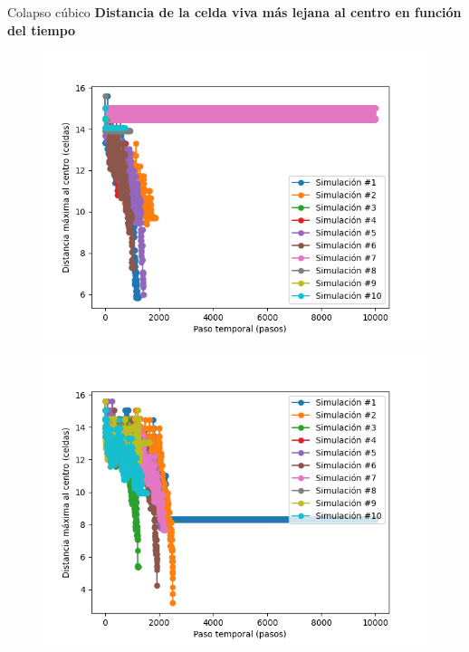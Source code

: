 \begin{frame}{Colapso cúbico}
    \textbf{Distancia de la celda viva más lejana al centro en función del tiempo}
    {\small
    \begin{multicols}{3}
        {
            \begin{figure}[H]
                \centering
                \includegraphics[width=0.8\linewidth]{pic/collapse3d/distance_i10}
                \label{fig:colapso:distance:i10}
            \end{figure}
        }

        {
            \begin{figure}[H]
                \centering
                \includegraphics[width=0.8\linewidth]{pic/collapse3d/distance_i30}
                \label{fig:colapso:distance:i30}
            \end{figure}
        }


\end{multicols}}
\end{frame}
